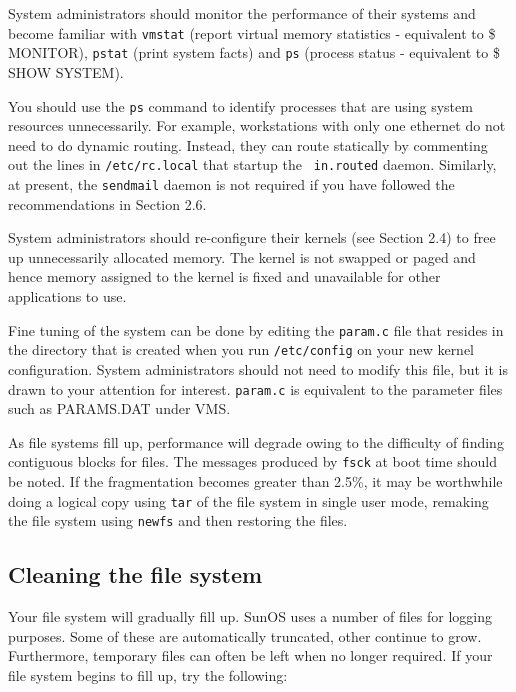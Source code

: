 System administrators should monitor the performance of their systems and
become familiar with {\tt vmstat} (report virtual memory statistics -
equivalent to \$ MONITOR),
{\tt pstat} (print system facts) and {\tt ps} (process status - equivalent to
\$ SHOW SYSTEM).

You should use the {\tt ps} command to identify processes that are using system
resources unnecessarily. For example, workstations with only one ethernet
do not need to do dynamic routing. Instead, they can route statically by
commenting out the lines in {\tt /etc/rc.local} that startup the {\tt
in.routed} daemon. Similarly, at present, the {\tt sendmail} daemon is not
required if you have followed the recommendations in Section 2.6.

System administrators should re-configure their kernels (see Section 2.4)
to free up unnecessarily allocated memory. The kernel is not swapped or paged
and hence memory assigned to the kernel is fixed and unavailable for other
applications to use.

Fine tuning of the system can be done by editing the {\tt param.c} file that resides
in the directory that is created when you run {\tt /etc/config} on your new kernel
configuration. System administrators should not need to modify this file, but
it is drawn to your attention for interest. {\tt param.c} is equivalent to the
parameter files such as PARAMS.DAT under VMS.

As file systems fill up, performance will degrade owing to the difficulty of
finding contiguous blocks for files. The messages produced by {\tt fsck} at
boot time should be noted. If the fragmentation becomes greater than 2.5\%,
it may be worthwhile doing a logical copy using {\tt tar} of the file system
in single user mode, remaking the file system using {\tt newfs} and then
restoring the files.


\subsection{Cleaning the file system}

Your file system will gradually fill up. SunOS uses a number of files for
logging purposes. Some of these are automatically truncated, other continue to
grow. Furthermore, temporary files can often be left when no longer required.
If your file system begins to fill up, try the following:

